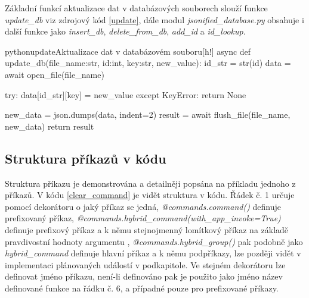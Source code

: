 \documentclass[
  program=inf,
biblatex=false,
sourcecodes=true,
joinlists=true,
  figures=true,
  tables=true,
  glossaries=true,
  index=false
]{kidiplom}
\begin{document}
Základní funkcí aktualizace dat v databázových souborech slouží funkce {\it update\_db} viz zdrojový
kód \ref{update}, dále modul {\it jsonified\_database.py} obsahuje i další funkce jako {\it insert\_db},
{\it delete\_from\_db}, {\it add\_id} a {\it id\_lookup}.
\newpage

\begin{kicode}{python}{update}{Aktualizace dat v databázovém souboru}[h!]
  async def update_db(file_name:str, id:int, key:str, new_value):
    id_str = str(id)
    data = await open_file(file_name)

    try:
        data[id_str][key] = new_value
    except KeyError:
        return None
    
    new_data = json.dumps(data, indent=2)
    result = await flush_file(file_name, new_data)
    return result
\end{kicode}

\subsection{Struktura příkazů v kódu}
Struktura příkazu je demonstrována a detailněji popsána na příkladu jednoho z příkazů.
V kódu \ref{clear_command} je vidět struktura v kódu. Řádek č. 1 určuje pomocí
dekorátoru o jaký příkaz se jedná, {\it @commands.command()} definuje prefixovaný příkaz, {\it 
@commands.hybrid\_command(with\_app\_invoke=True)} definuje prefixový příkaz a k němu stejnojmenný 
lomítkový příkaz na základě pravdivostní hodnoty argumentu 
, {\it @commands.hybrid\_group()} pak 
podobně jako {\it hybrid\_command} definuje hlavní příkaz a k němu podpříkazy, lze později vidět v implementaci
plánovaných událostí v podkapitole. Ve stejném dekorátoru lze definovat jméno příkazu, není-li definováno
pak je použito jako jméno název definované funkce na řádku č. 6, a případné  pouze pro
prefixované příkazy.

\end{document}
